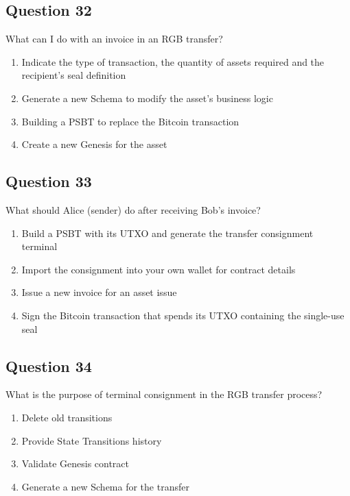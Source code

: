 \documentclass[12pt,a4paper]{article}
\begin{document}
\bigskip


\subsection*{Question 32}
What can I do with an invoice in an RGB transfer?

\begin{enumerate}[label=\Alph*., leftmargin=*]
\item Indicate the type of transaction, the quantity of assets required and the recipient's seal definition
\item Generate a new Schema to modify the asset's business logic
\item Building a PSBT to replace the Bitcoin transaction
\item Create a new Genesis for the asset
\end{enumerate}

\bigskip


\subsection*{Question 33}
What should Alice (sender) do after receiving Bob's invoice?

\begin{enumerate}[label=\Alph*., leftmargin=*]
\item Build a PSBT with its UTXO and generate the transfer consignment terminal
\item Import the consignment into your own wallet for contract details
\item Issue a new invoice for an asset issue
\item Sign the Bitcoin transaction that spends its UTXO containing the single-use seal
\end{enumerate}

\bigskip


\subsection*{Question 34}
What is the purpose of terminal consignment in the RGB transfer process?

\begin{enumerate}[label=\Alph*., leftmargin=*]
\item Delete old transitions
\item Provide State Transitions history
\item Validate Genesis contract
\item Generate a new Schema for the transfer
\end{enumerate}
\end{document}
